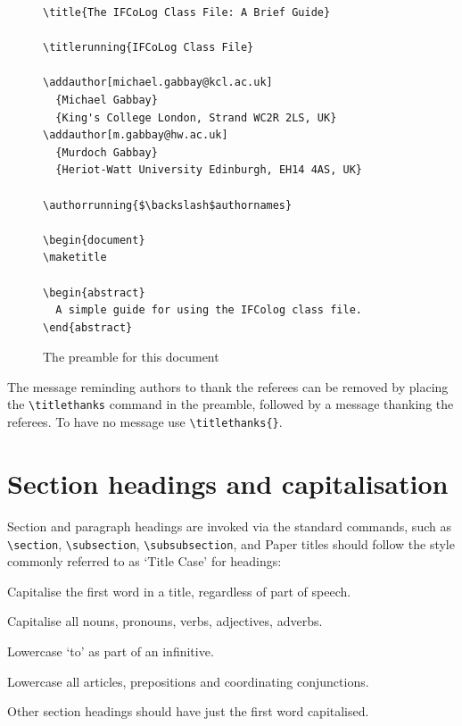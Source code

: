 \documentclass{ifcolog}
\begin{document}
\begin{figure}[t]
\begin{verbatim}
\title{The IFCoLog Class File: A Brief Guide}

\titlerunning{IFCoLog Class File}

\addauthor[michael.gabbay@kcl.ac.uk]
  {Michael Gabbay}
  {King's College London, Strand WC2R 2LS, UK}
\addauthor[m.gabbay@hw.ac.uk]
  {Murdoch Gabbay}
  {Heriot-Watt University Edinburgh, EH14 4AS, UK}

\authorrunning{$\backslash$authornames}

\begin{document}
\maketitle

\begin{abstract}
  A simple guide for using the IFColog class file.
\end{abstract}
\end{verbatim}
\caption{The preamble for this document}\label{fig1}
\end{figure}

The message reminding authors to thank the referees can be removed by placing the \verb+\titlethanks+ command in the preamble, followed by a message thanking the referees. 
To have no message use \verb+\titlethanks{}+.

\section{Section headings and capitalisation}
\label{section-headings}

Section and paragraph headings are invoked via the standard
commands, such as
\verb+\section+,
\verb+\subsection+,
\verb+\subsubsection+, and
Paper titles should follow the style commonly referred to as `Title Case' for headings:

\begin{enumerate*}
\item
Capitalise the first word in a title, regardless of part of speech.
\item
Capitalise all nouns, pronouns, verbs, adjectives, adverbs.
\item
Lowercase `to' as part of an infinitive.
\item
Lowercase all articles, prepositions and coordinating conjunctions.
\item
Other section headings should have just the first word capitalised.
\end{enumerate*}
\end{document}
